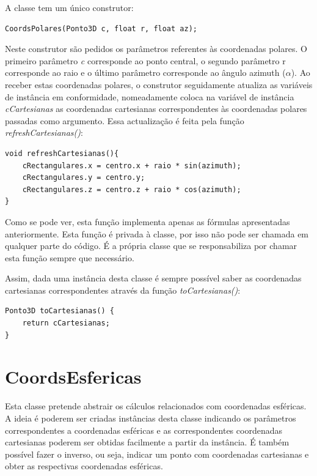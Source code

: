 A classe tem um único construtor:

\begin{Verbatim}
CoordsPolares(Ponto3D c, float r, float az);
\end{Verbatim}

Neste construtor são pedidos os parâmetros referentes às coordenadas polares. O primeiro parâmetro \textit{c} corresponde ao ponto central, o segundo parâmetro r corresponde ao raio e o último parâmetro corresponde ao ângulo azimuth ($\alpha$). Ao receber estas coordenadas polares, o construtor seguidamente atualiza as variáveis de instância em conformidade, nomeadamente coloca na variável de instância \textit{cCartesianas} as coordenadas cartesianas correspondentes às coordenadas polares passadas como argumento. Essa actualização é feita pela função \textit{refreshCartesianas()}:

\begin{Verbatim}
void refreshCartesianas(){
	cRectangulares.x = centro.x + raio * sin(azimuth);
	cRectangulares.y = centro.y;
	cRectangulares.z = centro.z + raio * cos(azimuth);
}
\end{Verbatim}

Como se pode ver, esta função implementa apenas as fórmulas apresentadas anteriormente. Esta função é privada à classe, por isso não pode ser chamada em qualquer parte do código. É a própria classe que se responsabiliza por chamar esta função sempre que necessário.

Assim, dada uma instância desta classe é sempre possível saber as coordenadas cartesianas correspondentes através da função \textit{toCartesianas()}:

\begin{Verbatim}
Ponto3D toCartesianas() {
	return cCartesianas;
}
\end{Verbatim}


\section{CoordsEsfericas}
\label{p1:cEsfericas}
Esta classe pretende abstrair os cálculos relacionados com coordenadas esféricas. A ideia é poderem ser criadas instâncias desta classe indicando os parâmetros correspondentes a coordenadas esféricas e as correspondentes coordenadas cartesianas poderem ser obtidas facilmente a partir da instância. É também possível fazer o inverso, ou seja, indicar um ponto com coordenadas cartesianas e obter as respectivas coordenadas esféricas.

